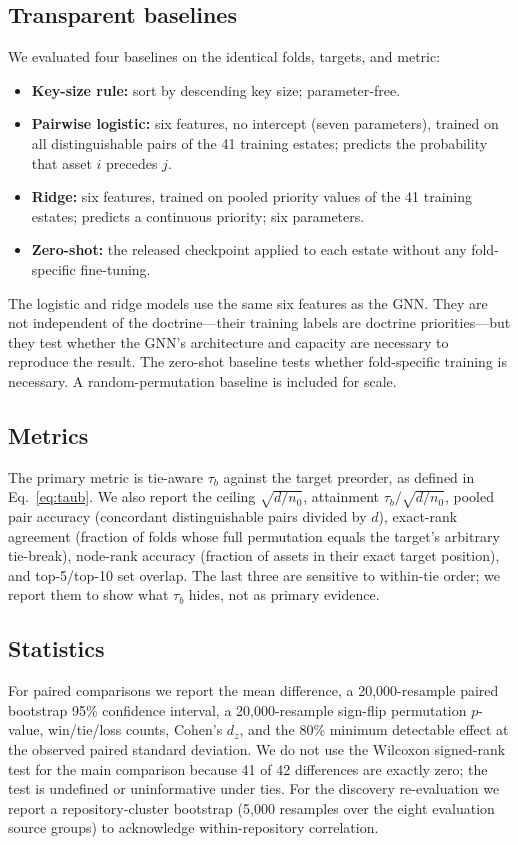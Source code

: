 \documentclass[conference,10pt]{IEEEtran}
\newcommand{\tb}{\tau_b}
\newcommand{\distinct}{d}
\newcommand{\nzero}{n_0}
\begin{document}
\subsection{Transparent baselines}
We evaluated four baselines on the identical folds, targets, and metric:
\begin{itemize}
\item \textbf{Key-size rule:} sort by descending key size; parameter-free.
\item \textbf{Pairwise logistic:} six features, no intercept (seven parameters), trained on all
distinguishable pairs of the 41 training estates; predicts the probability that asset $i$
precedes $j$.
\item \textbf{Ridge:} six features, trained on pooled priority values of the 41 training
estates; predicts a continuous priority; six parameters.
\item \textbf{Zero-shot:} the released checkpoint applied to each estate without any
fold-specific fine-tuning.
\end{itemize}
The logistic and ridge models use the same six features as the GNN. They are not independent of
the doctrine---their training labels are doctrine priorities---but they test whether the GNN's
architecture and capacity are necessary to reproduce the result. The zero-shot baseline tests
whether fold-specific training is necessary. A random-permutation baseline is included for
scale.

\subsection{Metrics}
The primary metric is tie-aware $\tb$ against the target preorder, as defined in
Eq.~\eqref{eq:taub}. We also report the ceiling $\sqrt{\distinct/\nzero}$, attainment
$\tb/\sqrt{\distinct/\nzero}$, pooled pair accuracy (concordant distinguishable pairs divided by
$\distinct$), exact-rank agreement (fraction of folds whose full permutation equals the target's
arbitrary tie-break), node-rank accuracy (fraction of assets in their exact target position),
and top-5/top-10 set overlap. The last three are sensitive to within-tie order; we report them
to show what $\tb$ hides, not as primary evidence.

\subsection{Statistics}
For paired comparisons we report the mean difference, a 20{,}000-resample paired bootstrap 95\%
confidence interval, a 20{,}000-resample sign-flip permutation $p$-value, win/tie/loss counts,
Cohen's $d_z$, and the 80\% minimum detectable effect at the observed paired standard deviation.
We do not use the Wilcoxon signed-rank test for the main comparison because 41 of 42 differences
are exactly zero; the test is undefined or uninformative under ties. For the discovery
re-evaluation we report a repository-cluster bootstrap (5{,}000 resamples over the eight
evaluation source groups) to acknowledge within-repository correlation.
\end{document}
